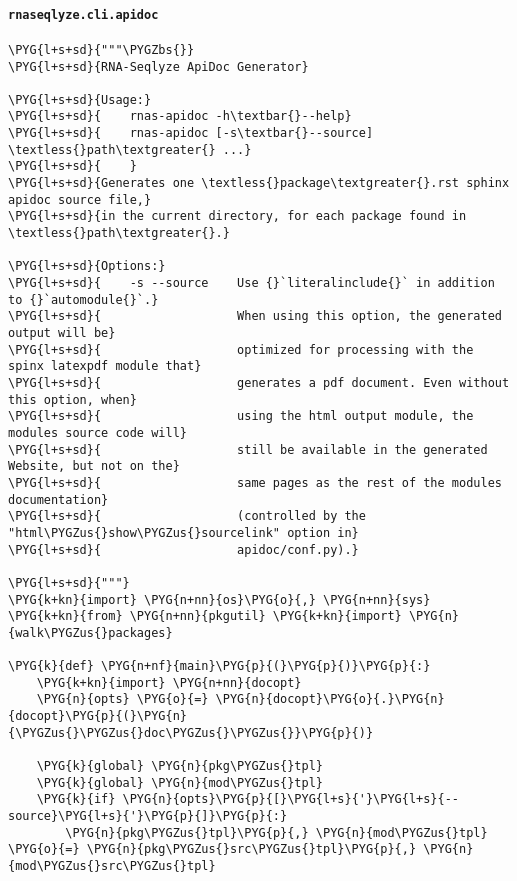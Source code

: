 \paragraph{\texttt{rnaseqlyze.cli.apidoc}}
\label{index-pdf4:rnaseqlyze-cli-apidoc}
\begin{Verbatim}[commandchars=\\\{\}]
\PYG{l+s+sd}{"""\PYGZbs{}}
\PYG{l+s+sd}{RNA-Seqlyze ApiDoc Generator}

\PYG{l+s+sd}{Usage:}
\PYG{l+s+sd}{    rnas-apidoc -h\textbar{}--help}
\PYG{l+s+sd}{    rnas-apidoc [-s\textbar{}--source] \textless{}path\textgreater{} ...}
\PYG{l+s+sd}{    }
\PYG{l+s+sd}{Generates one \textless{}package\textgreater{}.rst sphinx apidoc source file,}
\PYG{l+s+sd}{in the current directory, for each package found in \textless{}path\textgreater{}.}

\PYG{l+s+sd}{Options:}
\PYG{l+s+sd}{    -s --source    Use {}`literalinclude{}` in addition to {}`automodule{}`.}
\PYG{l+s+sd}{                   When using this option, the generated output will be}
\PYG{l+s+sd}{                   optimized for processing with the spinx latexpdf module that}
\PYG{l+s+sd}{                   generates a pdf document. Even without this option, when}
\PYG{l+s+sd}{                   using the html output module, the modules source code will}
\PYG{l+s+sd}{                   still be available in the generated Website, but not on the}
\PYG{l+s+sd}{                   same pages as the rest of the modules documentation}
\PYG{l+s+sd}{                   (controlled by the "html\PYGZus{}show\PYGZus{}sourcelink" option in}
\PYG{l+s+sd}{                   apidoc/conf.py).}

\PYG{l+s+sd}{"""}
\PYG{k+kn}{import} \PYG{n+nn}{os}\PYG{o}{,} \PYG{n+nn}{sys}
\PYG{k+kn}{from} \PYG{n+nn}{pkgutil} \PYG{k+kn}{import} \PYG{n}{walk\PYGZus{}packages}

\PYG{k}{def} \PYG{n+nf}{main}\PYG{p}{(}\PYG{p}{)}\PYG{p}{:}
    \PYG{k+kn}{import} \PYG{n+nn}{docopt}
    \PYG{n}{opts} \PYG{o}{=} \PYG{n}{docopt}\PYG{o}{.}\PYG{n}{docopt}\PYG{p}{(}\PYG{n}{\PYGZus{}\PYGZus{}doc\PYGZus{}\PYGZus{}}\PYG{p}{)}

    \PYG{k}{global} \PYG{n}{pkg\PYGZus{}tpl}
    \PYG{k}{global} \PYG{n}{mod\PYGZus{}tpl}
    \PYG{k}{if} \PYG{n}{opts}\PYG{p}{[}\PYG{l+s}{'}\PYG{l+s}{--source}\PYG{l+s}{'}\PYG{p}{]}\PYG{p}{:}
        \PYG{n}{pkg\PYGZus{}tpl}\PYG{p}{,} \PYG{n}{mod\PYGZus{}tpl} \PYG{o}{=} \PYG{n}{pkg\PYGZus{}src\PYGZus{}tpl}\PYG{p}{,} \PYG{n}{mod\PYGZus{}src\PYGZus{}tpl}


\end{Verbatim}
